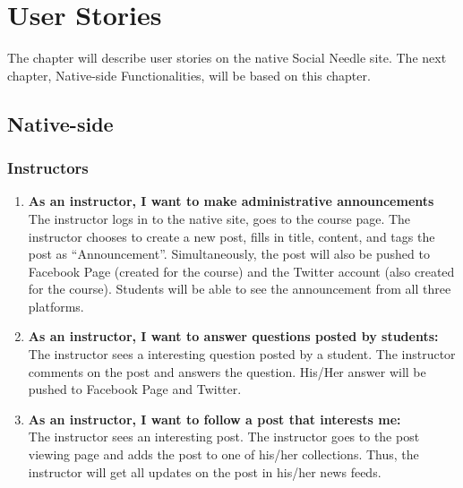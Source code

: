 
%
%

\chapter{User Stories}
The chapter will describe user stories on the native Social Needle site. The next chapter, Native-side Functionalities, will be based on this chapter. 

\section{Native-side}
\subsection{Instructors}
\begin{enumerate}
	\item \textbf{As an instructor, I want to make administrative announcements} \\
	The instructor logs in to the native site, goes to the course page. The instructor chooses to create a new post, fills in title, content, and tags the post as ``Announcement''. Simultaneously, the post will also be pushed to Facebook Page (created for the course) and the Twitter account (also created for the course). Students will be able to see the announcement from all three platforms.  
	
	\item \textbf{As an instructor, I want to answer questions posted by students:} \\
	The instructor sees a interesting question posted by a student. The instructor comments on the post and answers the question. His/Her answer will be pushed to Facebook Page and Twitter.
	 
	\item \textbf{As an instructor, I want to follow a post that interests me:} \\
	The instructor sees an interesting post. The instructor goes to the post viewing page and adds the post to one of his/her collections. Thus, the instructor will get all updates on the post in his/her news feeds.
\end{enumerate}

